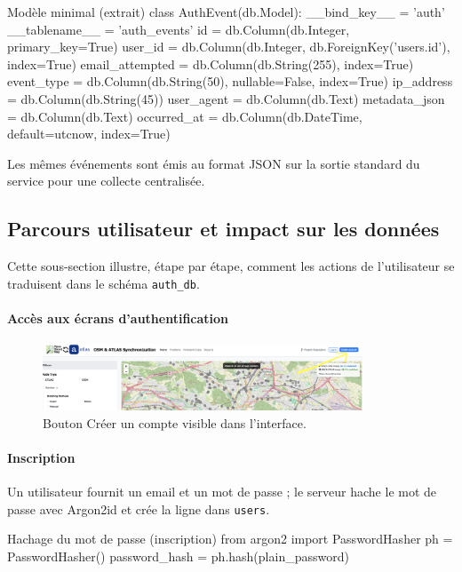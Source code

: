 \begin{codebox}[language=Python]{Modèle minimal (extrait)}
class AuthEvent(db.Model):
    __bind_key__ = 'auth'
    __tablename__ = 'auth_events'
    id = db.Column(db.Integer, primary_key=True)
    user_id = db.Column(db.Integer, db.ForeignKey('users.id'), index=True)
    email_attempted = db.Column(db.String(255), index=True)
    event_type = db.Column(db.String(50), nullable=False, index=True)
    ip_address = db.Column(db.String(45))
    user_agent = db.Column(db.Text)
    metadata_json = db.Column(db.Text)
    occurred_at = db.Column(db.DateTime, default=utcnow, index=True)
\end{codebox}

\noindent Les mêmes événements sont émis au format JSON sur la sortie standard du service pour une collecte centralisée.
\subsection{Parcours utilisateur et impact sur les données}
Cette sous-section illustre, étape par étape, comment les actions de l'utilisateur se traduisent dans le schéma \texttt{auth\_db}.

\paragraph{Accès aux écrans d'authentification}
\begin{figure}[H]
  \centering
  \includegraphics[width=0.85\textwidth]{../figures/chap10/auth1.png}
  \caption[Bouton Créer un compte]{Bouton \og Créer un compte \fg{} visible dans l'interface.}
\end{figure}

\paragraph{Inscription}
Un utilisateur fournit un email et un mot de passe ; le serveur hache le mot de passe avec Argon2id et crée la ligne dans \texttt{users}.

\begin{codebox}[language=Python]{Hachage du mot de passe (inscription)}
from argon2 import PasswordHasher
ph = PasswordHasher()
password_hash = ph.hash(plain_password)
\end{codebox}

